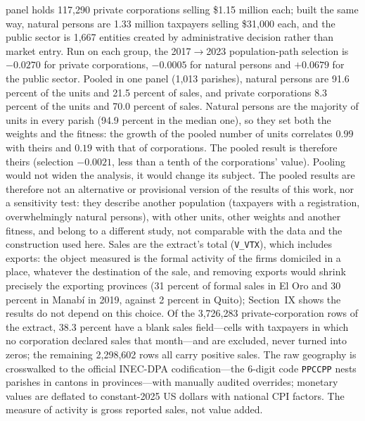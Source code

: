\documentclass[conference]{IEEEtran}
\begin{document}
panel holds 117{,}290 private corporations selling \$1.15 million each;
built the same way, natural persons are 1.33 million taxpayers selling
\$31{,}000 each, and the public sector is 1{,}667 entities created by
administrative decision rather than market entry. Run on each group, the
2017$\to$2023 population-path selection is $-0.0270$ for private
corporations, $-0.0005$ for natural persons and $+0.0679$ for the public
sector. Pooled in one panel (1{,}013 parishes), natural persons are 91.6
percent of the units and 21.5 percent of sales, and private corporations
8.3 percent of the units and 70.0 percent of sales. Natural persons are
the majority of units in every parish (94.9 percent in the median one), so
they set both the weights and the fitness: the growth of the pooled
number of units correlates $0.99$ with theirs and $0.19$ with that of
corporations. The pooled result is therefore theirs (selection $-0.0021$,
less than a tenth of the corporations' value). Pooling would not widen the analysis, it would change its subject. The
pooled results are therefore not an alternative or provisional version of
the results of this work, nor a sensitivity test: they describe another
population (taxpayers with a registration, overwhelmingly natural
persons), with other units, other weights and another fitness, and belong
to a different study, not comparable with the data and the construction
used here.
Sales are
the extract's total (\texttt{V\_VTX}), which includes exports: the object
measured is the formal activity of the firms domiciled in a place,
whatever the destination of the sale, and removing exports would shrink
precisely the exporting provinces (31 percent of formal sales in El Oro
and 30 percent in Manab\'i in 2019, against 2 percent in Quito);
Section~IX shows the results do not depend on this choice. Of the
3{,}726{,}283 private-corporation rows of the extract, 38.3 percent have
a blank sales field---cells with taxpayers in which no corporation
declared sales that month---and are excluded, never turned into zeros;
the remaining 2{,}298{,}602 rows all carry positive sales. The raw
geography is crosswalked to the official INEC-DPA codification---the
6-digit code \texttt{PPCCPP} nests parishes in cantons in provinces---with
manually audited overrides; monetary values are deflated to constant-2025
US dollars with national CPI factors. The measure of activity is gross
reported sales, not value added.
\end{document}
